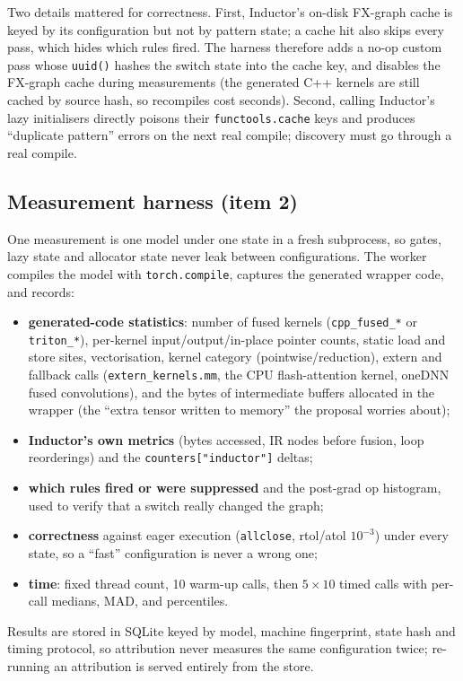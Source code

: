 \documentclass[11pt]{article}
\newcommand{\code}[1]{\texttt{#1}}
\begin{document}
Two details mattered for correctness. First, Inductor's on-disk FX-graph cache is keyed by its
configuration but not by pattern state; a cache hit also skips every pass, which hides which rules
fired. The harness therefore adds a no-op custom pass whose \code{uuid()} hashes the switch state
into the cache key, and disables the FX-graph cache during measurements (the generated C++ kernels
are still cached by source hash, so recompiles cost seconds). Second, calling Inductor's lazy
initialisers directly poisons their \code{functools.cache} keys and produces ``duplicate pattern''
errors on the next real compile; discovery must go through a real compile.

\subsection{Measurement harness (item 2)}
One measurement is one model under one state in a fresh subprocess, so gates, lazy state and
allocator state never leak between configurations. The worker compiles the model with
\code{torch.compile}, captures the generated wrapper code, and records:
\begin{itemize}
\item \textbf{generated-code statistics}: number of fused kernels (\code{cpp\_fused\_*} or
  \code{triton\_*}), per-kernel input/output/in-place pointer counts, static load and store sites,
  vectorisation, kernel category (pointwise/reduction), extern and fallback calls
  (\code{extern\_kernels.mm}, the CPU flash-attention kernel, oneDNN
  fused convolutions), and the bytes of intermediate buffers allocated in the wrapper
  (the ``extra tensor written to memory'' the proposal worries about);
\item \textbf{Inductor's own metrics} (bytes accessed, IR nodes before fusion, loop reorderings) and
  the \code{counters["inductor"]} deltas;
\item \textbf{which rules fired or were suppressed} and the post-grad op histogram, used to verify
  that a switch really changed the graph;
\item \textbf{correctness} against eager execution (\code{allclose}, rtol/atol $10^{-3}$) under every
  state, so a ``fast'' configuration is never a wrong one;
\item \textbf{time}: fixed thread count, 10 warm-up calls, then $5\times10$ timed calls with
  per-call medians, MAD, and percentiles.
\end{itemize}
Results are stored in SQLite keyed by model, machine fingerprint, state hash and timing protocol,
so attribution never measures the same configuration twice; re-running an attribution is served
entirely from the store.
\end{document}
